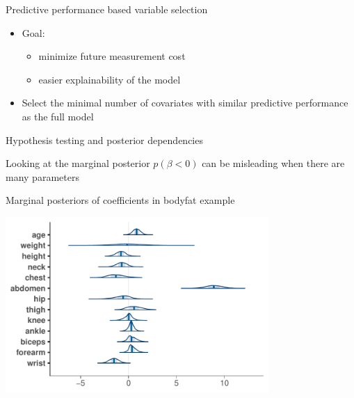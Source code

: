 \documentclass[english,t]{beamer}
\begin{document}
\begin{frame}{Predictive performance based variable selection}

  \begin{itemize}
  \item Goal:
    \begin{itemize}
    \item minimize future measurement cost
    \item easier explainability of the model
    \end{itemize}
  \item<2-> Select the minimal number of covariates with similar
    predictive performance as the full model
  \end{itemize}

\end{frame}

\begin{frame}{Hypothesis testing and posterior dependencies}

  \vspace{-0.5\baselineskip}
  Looking at the marginal posterior $p(\beta < 0)$ can be misleading when there
  are many parameters
  
  Marginal posteriors of coefficients in bodyfat example
  
  \includegraphics[width=10cm]{bodyfat_mcmc_areas.pdf}

\end{frame}
\end{document}
